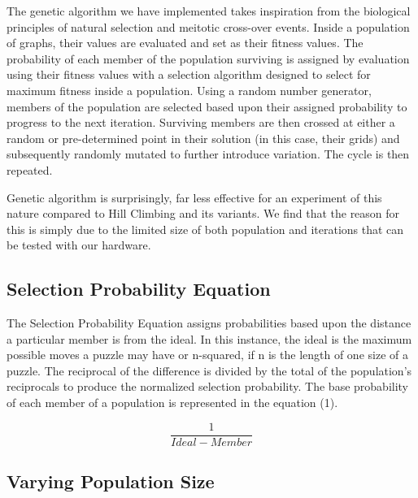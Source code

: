\documentclass[12pt]{article}
\begin{document}
The genetic algorithm we have implemented takes inspiration from the biological principles of natural selection and meitotic cross-over events. Inside a population of graphs, their values are evaluated and set as their fitness values. The probability of each member of the population surviving is assigned by evaluation using their fitness values with a selection algorithm designed to select for maximum fitness inside a population. Using a random number generator, members of the population are selected based upon their assigned probability to progress to the next iteration. Surviving members are then crossed at either a random or pre-determined point in their solution (in this case, their grids) and subsequently randomly mutated to further introduce variation. The cycle is then repeated. \newline

Genetic algorithm is surprisingly, far less effective for an experiment of this nature compared to Hill Climbing and its variants. We find that the reason for this is simply due to the limited size of both population and iterations that can be tested with our hardware.

\subsection*{Selection Probability Equation}
The Selection Probability Equation assigns probabilities based upon the distance a particular member is from the ideal. In this instance, the ideal is the maximum possible moves a puzzle may have or n-squared, if n is the length of one size of a puzzle. The reciprocal of the difference is divided by the total of the population's reciprocals to produce the normalized selection probability. The base probability of each member of a population is represented in the equation (1).

\begin{equation}
\frac{1}{Ideal-Member}
\end{equation}

\subsection*{Varying Population Size}
\end{document}
